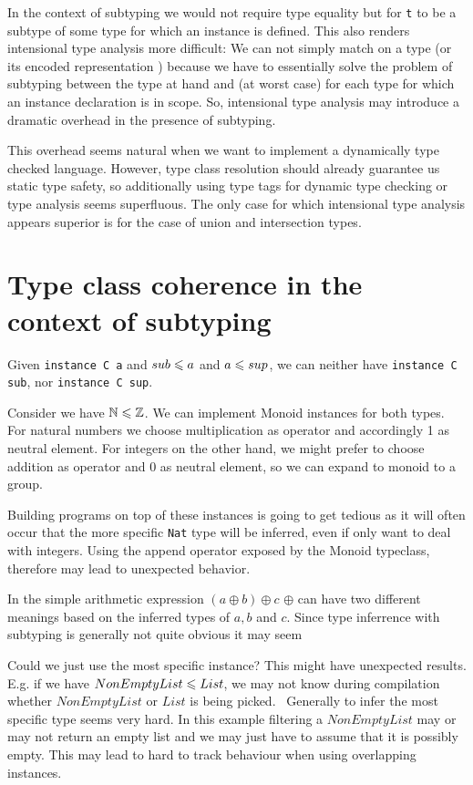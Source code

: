 In the context of subtyping we would not require type equality but for \texttt{t} to be a subtype of some type for which an instance is defined.
This also renders intensional type analysis more difficult:
We can not simply match on a type (or its encoded representation \cite{weirich2000}) because we have to essentially solve the problem of subtyping between the type at hand and (at worst case) for each type for which an instance declaration is in scope.
So, intensional type analysis may introduce a dramatic overhead in the presence of subtyping.

This overhead seems natural when we want to implement a dynamically type checked language.
However, type class resolution should already guarantee us static type safety, so additionally using type tags for dynamic type checking or type analysis seems superfluous.
The only case for which intensional type analysis appears superior is for the case of union and intersection types.

\section{Type class coherence in the context of subtyping}
  Given \texttt{instance C a} and $sub \leqslant a$ and $a \leqslant sup$, we can neither have \texttt{instance C sub}, nor \texttt{instance C sup}.

  Consider we have $\mathbb{N} \leqslant \mathbb{Z}$.
  We can implement Monoid instances for both types. For natural numbers we choose multiplication as operator and accordingly 1 as neutral element.
  For integers on the other hand, we might prefer to choose addition as operator and 0 as neutral element, so we can expand to monoid to a group.

  Building programs on top of these instances is going to get tedious as it will often occur that the more specific \texttt{Nat} type will be inferred,
  even if only want to deal with integers.
  Using the append operator exposed by the Monoid typeclass, therefore may lead to unexpected behavior.

  In the simple arithmetic expression $(a \oplus b) \oplus c$ $\oplus$ can have two different meanings based on the inferred types of $a,b$ and $c$.
  Since type inferrence with subtyping is generally not quite obvious it may seem 

  Could we just use the most specific instance? This might have unexpected results.
  E.g. if we have $NonEmptyList \leqslant List$, we may not know during compilation whether $NonEmptyList$ or $List$ is being picked.
  ~Generally to infer the most specific type seems very hard. In this example filtering a $NonEmptyList$ may or may not return an empty list and we may just have to assume that it is possibly empty.
  This may lead to hard to track behaviour when using overlapping instances.

